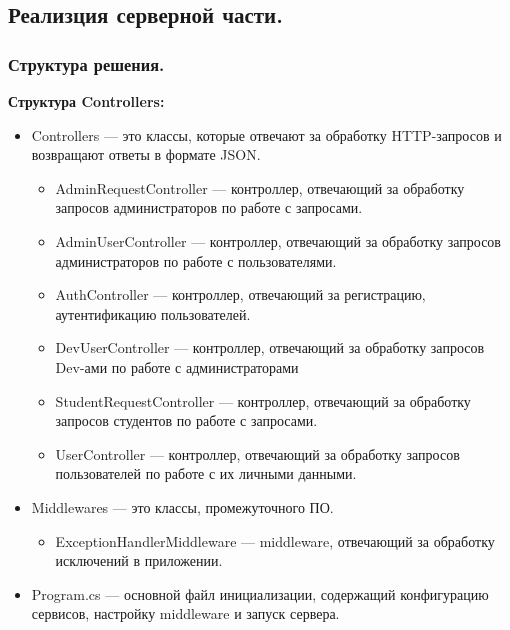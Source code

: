 \subsection{Реализция серверной части.}

\subsubsection{Структура решения.}

\textbf{Структура Controllers:}
\begin{itemize}
	\item{Controllers --- это классы, которые отвечают за обработку HTTP-запросов и возвращают ответы в формате JSON.
			\begin{itemize}
				\item{AdminRequestController --- контроллер, отвечающий за обработку запросов администраторов по работе с запросами.}
				\item{AdminUserController --- контроллер, отвечающий за обработку запросов администраторов по работе с пользователями.}
				\item{AuthController --- контроллер, отвечающий за регистрацию, аутентификацию пользователей.}
				\item{DevUserController --- контроллер, отвечающий за обработку запросов Dev-ами по работе с администраторами}
				\item{StudentRequestController --- контроллер, отвечающий за обработку запросов студентов по работе с запросами.}
				\item{UserController --- контроллер, отвечающий за обработку запросов пользователей по работе с их личными данными.}
			\end{itemize}
		}
	\item{Middlewares --- это классы, промежуточного ПО.
			\begin{itemize}
				\item{ExceptionHandlerMiddleware --- middleware, отвечающий за обработку исключений в приложении.}
			\end{itemize}
		}
	\item{Program.cs --- основной файл инициализации, содержащий конфигурацию сервисов, настройку middleware и запуск сервера.}
\end{itemize}

